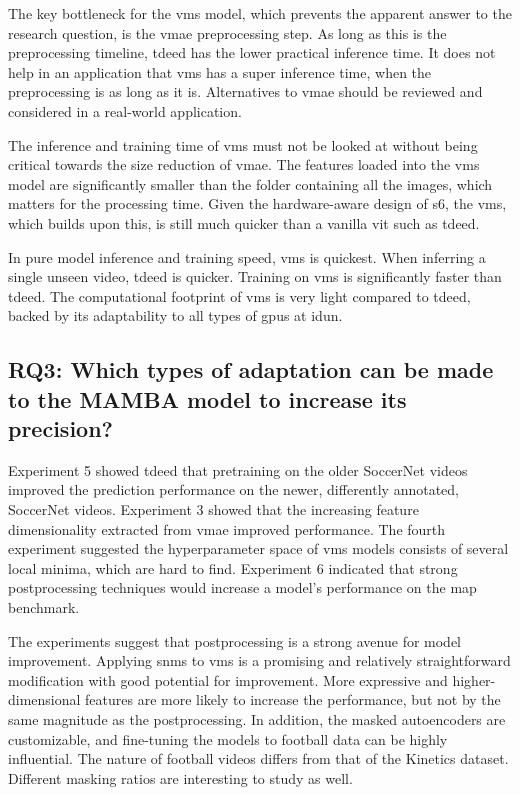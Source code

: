 The key bottleneck for the \acrshort{vms} model, which prevents the apparent answer to the research question, is the \acrshort{vmae} preprocessing step. As long as this is the preprocessing timeline, \acrshort{tdeed} has the lower practical inference time. It does not help in an application that \acrshort{vms} has a super inference time, when the preprocessing is as long as it is. Alternatives to \acrshort{vmae} should be reviewed and considered in a real-world application. 

The inference and training time of \acrshort{vms} must not be looked at without being critical towards the size reduction of \acrshort{vmae}. The features loaded into the \acrshort{vms} model are significantly smaller than the folder containing all the images, which matters for the processing time. Given the hardware-aware design of \acrfull{s6}, the \acrshort{vms}, which builds upon this, is still much quicker than a vanilla \acrfull{vit} such as \acrshort{tdeed}.

In pure model inference and training speed, \acrshort{vms} is quickest. When inferring a single unseen video, \acrshort{tdeed} is quicker. Training on \acrshort{vms} is significantly faster than \acrshort{tdeed}. The computational footprint of \acrshort{vms} is very light compared to \acrshort{tdeed}, backed by its adaptability to all types of \acrshort{gpu}s at \acrshort{idun}. 


\subsection{RQ3: Which types of adaptation can be made to the MAMBA model to increase its precision?}


Experiment 5 showed \acrshort{tdeed} that pretraining on the older SoccerNet videos improved the prediction performance on the newer, differently annotated, SoccerNet videos. Experiment 3 showed that the increasing feature dimensionality extracted from \acrshort{vmae} improved performance. The fourth experiment suggested the hyperparameter space of \acrshort{vms} models consists of several local minima, which are hard to find. Experiment 6 indicated that strong postprocessing techniques would increase a model's performance on the \acrshort{map} benchmark. 


The experiments suggest that postprocessing is a strong avenue for model improvement. Applying \acrfull{snms} to \acrshort{vms} is a promising and relatively straightforward modification with good potential for improvement. More expressive and higher-dimensional features are more likely to increase the performance, but not by the same magnitude as the postprocessing. In addition, the masked autoencoders are customizable, and fine-tuning the models to football data can be highly influential. The nature of football videos differs from that of the Kinetics dataset. Different masking ratios are interesting to study as well. 



